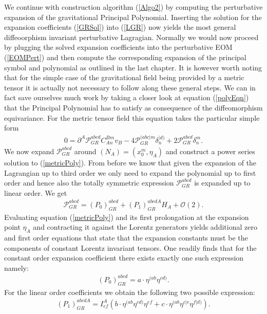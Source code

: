 \documentclass[a4paper,12pt, DIV=14, BCOR=5mm, twoside, headsepline, numbers=noenddot]{scrbook}
\begin{document}
We continue with construction algorithm (\ref{Algo2}) by computing the perturbative expansion of the gravitational Principal Polynomial. Inserting the solution for the expansion coefficients (\ref{GRSol}) into (\ref{LGR}) now yields the most general diffeoorphism invariant perturbative Lagragian. Normally we would now proceed by plugging the solved expansion coefficients into the perturbative EOM (\ref{EOMPert}) and then compute the corresponding expansion of the principal symbol and polynomial as outlined in the last chapter. It is however worth noting that for the simple case of the gravitational field being provided by a metric tensor it is actually not necessary to follow along these general steps. We can in fact save ourselves much work by taking a closer look at equation (\ref{polyEqn}) that the Principal Polynomial has to satisfy as consequence of the diffeomorphism equivariance. For the metric tensor field this equation takes the particular simple form
\begin{align}\label{metricPoly}
    0 = \partial^A \mathcal{P}_{GR}^{abcd} C_{An}^{Bm} v_B - 4\mathcal{P}_{GR}^{(abc\vert m} \delta_n^{\vert d)} + 2 \mathcal{P}_{GR}^{abcd} \delta^m_n.
\end{align}
We now expand $\mathcal{P}_{GR}^{abcd}$ around $(N_{A}) = (x_0^m, \eta_A)$ and construct a power series solution to (\ref{metricPoly}). From before we know that given the expansion of the Lagrangian up to third order we only need to expand the polynomial up to first order and hence also the totally symmetric expression $\mathcal{P}_{GR}^{abcd}$ is expanded up to linear order. We get 
\begin{align}
    \mathcal{P}_{GR}^{abcd} = (P_0)_{GR}^{abcd} + (P_1)_{GR}^{abcdA} H_A + \mathcal{O}(2).
\end{align}
Evaluating equation (\ref{metricPoly}) and its first prolongation at the expansion point $\eta_A$ and contracting it against the Lorentz generators yields additional zero and first order equations that state that the expansion constants must be the components of constant Lorentz invariant tensors. One readily finds that for the constant order expansion coefficient there exists exactly one such expression namely:
\begin{align}
   (P_0)_{GR}^{abcd} = a \cdot \eta^{(ab} \eta^{cd)}. 
\end{align}
For the linear order coefficients we obtain the following two possible expression:
\begin{align}
    (P_1)_{GR}^{abcdA} = I^A_{ef} \left (b \cdot \eta^{(ab} \eta^{cd)}  \eta^{ef} + c \cdot \eta^{(ab} \eta^{c \vert e} \eta^{f \vert d)} \right ).
\end{align}
\end{document}
